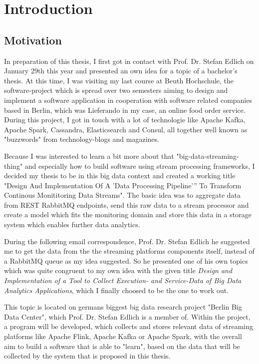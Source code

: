 \chapter{Introduction}

\section{Motivation}

In preparation of this thesis, I first got in contact with Prof. Dr. Stefan Edlich on January 29th
this year and presented an own idea for a topic of a bachelor's thesis. At this time, I was
visiting my last course at Beuth Hochschule, the software-project which is spread over two semesters
aiming to design and implement a software application in cooperation with software related companies
based in Berlin, which was Lieferando in my case, an online food order service. During this project,
I got in touch with a lot of technologie like Apache Kafka, Apache Spark, Cassandra, Elasticsearch
and Consul, all together well known as "buzzwords" from technology-blogs and magazines.

Because I was interested to learn a bit more about that "big-data-streaming-thing" and especially how
to build software using stream processing frameworks, I decided my thesis to be in this big data context
and created a working title "Design And Implementation Of A 'Data Processing Pipeline'” To Transform
Continous Monititoring Data Streams". The basic idea was to aggregate data from REST RabbitMQ endpoints,
send this raw data to a stream processor and create a model which fits the monitoring domain and store
this data in a storage system which enables further data analytics.

During the following email correspondence, Prof. Dr. Stefan Edlich he suggested me to get the data
from the the streaming platforms components itself, instead of a RabbitMQ queue as my idea suggested.
So he presented one of his own topics which was quite congruent to my own idea with the given title
\textit{Design and Implementation of a Tool to Collect Execution- and Service-Data of Big Data Analytics
Applications}, which I finally choosed to be the one to work out.

This topic is located on germans biggest big data research project "Berlin Big Data Center", which
Prof. Dr. Stefan Edlich is a member of. Within the project, a program will be developed, which collects
and stores relevant data of streaming platforms like Apache Flink, Apache Kafka or Apache Spark,
with the overall aim to build a software that is able to "learn", based on the data that
will be collected by the system that is proposed in this thesis.


